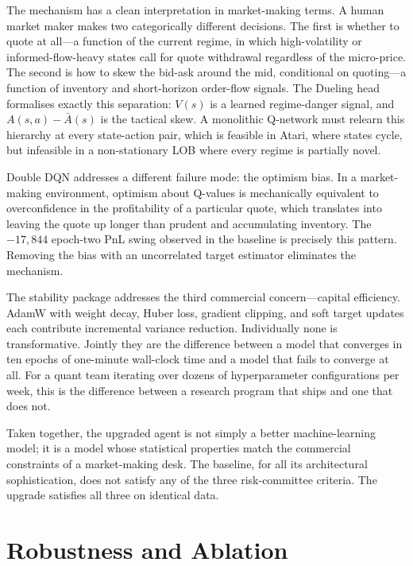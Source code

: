 \documentclass[12pt]{article}
\begin{document}
The mechanism has a clean interpretation in market-making terms. A human market maker makes two categorically different decisions. The first is whether to quote at all---a function of the current regime, in which high-volatility or informed-flow-heavy states call for quote withdrawal regardless of the micro-price. The second is how to skew the bid-ask around the mid, conditional on quoting---a function of inventory and short-horizon order-flow signals. The Dueling head formalises exactly this separation: $V(s)$ is a learned regime-danger signal, and $A(s,a) - \bar A(s)$ is the tactical skew. A monolithic Q-network must relearn this hierarchy at every state-action pair, which is feasible in Atari, where states cycle, but infeasible in a non-stationary LOB where every regime is partially novel.

Double DQN addresses a different failure mode: the optimism bias. In a market-making environment, optimism about Q-values is mechanically equivalent to overconfidence in the profitability of a particular quote, which translates into leaving the quote up longer than prudent and accumulating inventory. The $-17{,}844$ epoch-two PnL swing observed in the baseline is precisely this pattern. Removing the bias with an uncorrelated target estimator eliminates the mechanism.

The stability package addresses the third commercial concern---capital efficiency. AdamW with weight decay, Huber loss, gradient clipping, and soft target updates each contribute incremental variance reduction. Individually none is transformative. Jointly they are the difference between a model that converges in ten epochs of one-minute wall-clock time and a model that fails to converge at all. For a quant team iterating over dozens of hyperparameter configurations per week, this is the difference between a research program that ships and one that does not.

Taken together, the upgraded agent is not simply a better machine-learning model; it is a model whose statistical properties match the commercial constraints of a market-making desk. The baseline, for all its architectural sophistication, does not satisfy any of the three risk-committee criteria. The upgrade satisfies all three on identical data.

\section{Robustness and Ablation}
\end{document}
